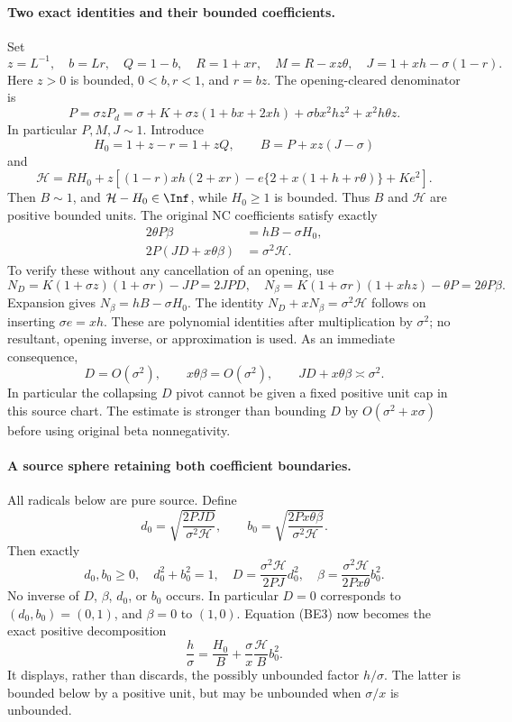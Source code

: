 \paragraph{Two exact identities and their bounded coefficients.}
Set
\[
 z=L^{-1},\quad b=Lr,\quad Q=1-b,\quad
 R=1+xr,\quad M=R-xz\theta,\quad J=1+xh-\sigma(1-r).
\]
Here $z>0$ is bounded, $0<b,r<1$, and $r=bz$.
The opening-cleared denominator is
\[
 P=\sigma zP_d
 =\sigma+K+\sigma z(1+bx+2xh)
   +\sigma bx^2hz^2+x^2h\theta z.
\]
In particular $P,M,J\sim1$. Introduce
\[
 H_0=1+z-r=1+zQ,\qquad B=P+xz(J-\sigma)
\]
and
\[
 \mathcal H=RH_0+z\left[(1-r)xh(2+xr)
 -e\{2+x(1+h+r\theta)\}+Ke^2\right].
 \tag{BE2}
\]
Then $B\sim1$, and $\mathcal H-H_0\in\Inf$, while $H_0\ge1$ is
bounded. Thus $B$ and $\mathcal H$ are positive bounded units.
The original NC coefficients satisfy exactly
\begin{align*}
 2\theta P\beta&=hB-\sigma H_0,                    \tag{BE3}\\
 2P(JD+x\theta\beta)&=\sigma^2\mathcal H.         \tag{BE4}
\end{align*}
To verify these without any cancellation of an opening, use
\[
 N_D=K(1+\sigma z)(1+\sigma r)-JP=2JPD,
 \quad
 N_\beta=K(1+\sigma r)(1+xhz)-\theta P=2\theta P\beta.
\]
Expansion gives $N_\beta=hB-\sigma H_0$. The identity
$N_D+xN_\beta=\sigma^2\mathcal H$ follows on inserting
$\sigma e=xh$. These are polynomial identities after multiplication
by $\sigma^2$; no resultant, opening inverse, or approximation is used.
As an immediate consequence,
\[
 D=O(\sigma^2),\qquad x\theta\beta=O(\sigma^2),\qquad
 JD+x\theta\beta\asymp\sigma^2.
 \tag{BE5}
\]
In particular the collapsing $D$ pivot cannot be given a fixed positive
unit cap in this source chart. The estimate is stronger than bounding
$D$ by $O(\sigma^2+x\sigma)$ before using original beta nonnegativity.

\paragraph{A source sphere retaining both coefficient boundaries.}
All radicals below are pure source. Define
\[
 d_0=\sqrt{\frac{2PJD}{\sigma^2\mathcal H}},\qquad
 b_0=\sqrt{\frac{2Px\theta\beta}{\sigma^2\mathcal H}}.
\]
Then exactly
\[
 d_0,b_0\ge0,\quad d_0^2+b_0^2=1,
 \quad D=\frac{\sigma^2\mathcal H}{2PJ}d_0^2,
 \quad \beta=\frac{\sigma^2\mathcal H}{2Px\theta}b_0^2.
 \tag{BE6}
\]
No inverse of $D$, $\beta$, $d_0$, or $b_0$ occurs. In particular
$D=0$ corresponds to $(d_0,b_0)=(0,1)$, and $\beta=0$ to $(1,0)$.
Equation (BE3) now becomes the exact positive decomposition
\[
 \frac h\sigma=\frac{H_0}{B}
       +\frac\sigma x\frac{\mathcal H}{B}b_0^2.
 \tag{BE7}
\]
It displays, rather than discards, the possibly unbounded factor
$h/\sigma$. The latter is bounded below by a positive unit, but may
be unbounded when $\sigma/x$ is unbounded.

